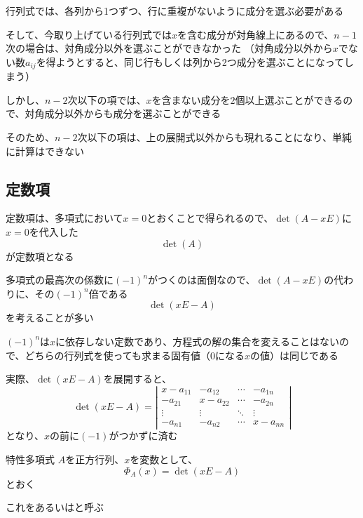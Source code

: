 \documentclass[../../../topic_linear-algebra]{subfiles}
\begin{document}
行列式では、各列から1つずつ、行に重複がないように成分を選ぶ必要がある

そして、今取り上げている行列式では$x$を含む成分が対角線上にあるので、$n-1$次の場合は、対角成分以外を選ぶことができなかった
（対角成分以外から$x$でない数$a_{ij}$を得ようとすると、同じ行もしくは列から2つ成分を選ぶことになってしまう）

\br

しかし、$n-2$次以下の項では、$x$を含まない成分を$2$個以上選ぶことができるので、対角成分以外からも成分を選ぶことができる

そのため、$n-2$次以下の項は、上の展開式以外からも現れることになり、単純に計算はできない

\subsection{定数項}

定数項は、多項式において$x=0$とおくことで得られるので、$\det(A - xE)$に$x=0$を代入した
\begin{equation*}
  \det(A)
\end{equation*}
が定数項となる

\sectionline

多項式の最高次の係数に$(-1)^n$がつくのは面倒なので、$\det(A - xE)$の代わりに、その$(-1)^n$倍である
\begin{equation*}
  \det(xE - A)
\end{equation*}
を考えることが多い

\br

$(-1)^n$は$x$に依存しない定数であり、方程式の解の集合を変えることはないので、どちらの行列式を使っても求まる固有値（0になる$x$の値）は同じである

\br

実際、$\det(xE - A)$を展開すると、
\begin{equation*}
  \det(xE - A) = \left| \begin{matrix}
    x - a_{11} & -a_{12}    & \cdots & -a_{1n}    \\
    -a_{21}    & x - a_{22} & \cdots & -a_{2n}    \\
    \vdots     & \vdots     & \ddots & \vdots     \\
    -a_{n1}    & -a_{n2}    & \cdots & x - a_{nn}
  \end{matrix} \right|
\end{equation*}
となり、$x$の前に$(-1)$がつかずに済む

\sectionline

\begin{definition}{特性多項式}
  $A$を正方行列、$x$を変数として、
  \begin{equation*}
    \Phi_A(x) = \det(xE - A)
  \end{equation*}
  とおく

  これをあるいはと呼ぶ
\end{definition}
\end{document}
